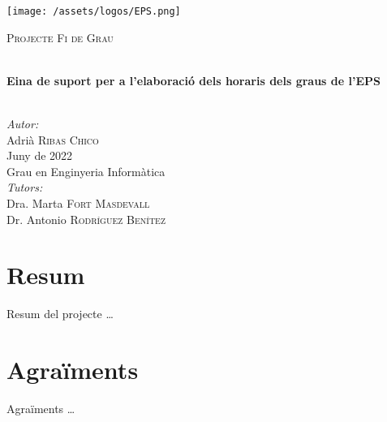 \documentclass[a4paper,12pt]{ThesisStyle}
\begin{document}
\newpage

\begin{titlepage}

  \texttt{[image: /assets/logos/EPS.png]} \\[1cm]
  \begin{center}
    \textsc{\Large Projecte Fi de Grau} \\[1cm]

    \begin{spacing}{2}
      \HRule \\
      \textbf{\Huge Eina de suport per a l’elaboració dels horaris dels graus de l’EPS} \\
      \HRule \\[0.5cm]
    \end{spacing}

    {
    \large
    \emph{Autor:} \\
    Adrià \textsc{Ribas Chico} \\[1cm]
    Juny de 2022 \\[1cm]
    Grau en Enginyeria Informàtica \\[1cm]
    \emph{Tutors:} \\
    Dra. Marta \textsc{Fort Masdevall} \\
    Dr. Antonio \textsc{Rodríguez Benítez} \\
    }

  \end{center}
\end{titlepage}

\titlepage

\dominitoc


\chapter*{Resum}
\label{cap:resum}

Resum del projecte \ldots

\chapter*{Agraïments}
\label{cap:agraiments}

Agraïments \ldots


\tableofcontents

\listoffigures

\listoftables

\mainmatter
\end{document}
